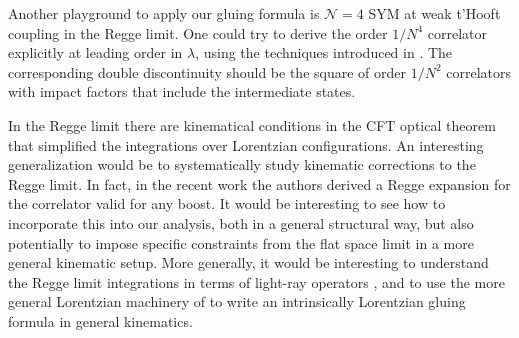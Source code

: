 Another playground to apply our gluing formula  is $\mathcal{N}=4$ SYM at weak t'Hooft coupling in the Regge limit. One could try to derive the order $1/N^4$ correlator
explicitly  at leading order in $\lambda$, using the techniques introduced in \cite{Cornalba:2008qf}. The corresponding double discontinuity should be the square 
of order  $1/N^2$ correlators with impact factors that include the intermediate states. 

In the Regge limit there are kinematical conditions in the CFT optical theorem that simplified the integrations over Lorentzian configurations. An interesting generalization would be to systematically study kinematic corrections to the Regge limit. In fact, in the recent work \cite{Caron-Huot:2020nem} the authors derived a Regge expansion for the correlator valid for any boost. It would be interesting to see how to incorporate this into our analysis, both in a general structural way, but also potentially to impose specific constraints from the flat space limit in a more general kinematic setup. More generally, it would be interesting to understand the Regge limit integrations in terms of light-ray operators \cite{Kravchuk:2018htv}, and to use the more general Lorentzian machinery of \cite{Simmons_Duffin_2018,Kravchuk:2018htv} to write an intrinsically Lorentzian gluing formula in general kinematics.

